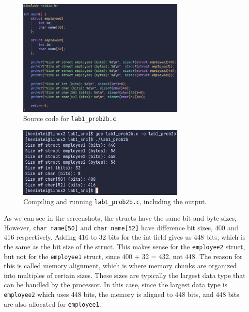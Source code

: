 \documentclass{article}
\begin{document}
\begin{figure}[H]
    \centering
    \includegraphics[width=0.75\textwidth]{./images/prob2partb1.png}
    \caption{Source code for \lstinline!lab1_prob2b.c!}
\end{figure}

\begin{figure}[H]
    \centering
    \includegraphics[width=0.75\textwidth]{./images/prob2partb2.png}
    \caption{Compiling and running \lstinline!lab1_prob2b.c!, including the output.}
\end{figure}

As we can see in the screenshots, the structs have the same bit and byte sizes,
However, \lstinline!char name[50]! and \lstinline!char name[52]! have difference bit sizes, 400 and 416 respectively.
Adding 416 to 32 bits for the int field gives us 448 bits, which is the same as the bit size of the struct.
This makes sense for the \lstinline!employee2! struct, but not for the \lstinline!employee1! struct, since 400 + 32 = 432, not 448.
The reason for this is called memory alignment, which is where memory chunks are organized into multiples of certain sizes.
These sizes are typically the largest data type that can be handled by the processor.
In this case, since the largest data type is \lstinline!employee2! which uses 448 bits, the memory is aligned to 448 bits, and 448 bits are also allocated for \lstinline!employee1!.

\newpage
\end{document}
